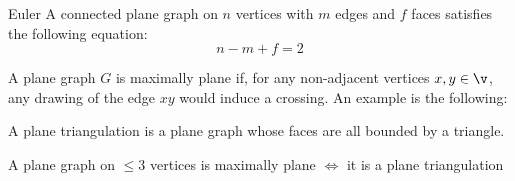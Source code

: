 \begin{customtheorem}{Euler}
\label{theorem:euler}
    A connected plane graph on $n$ vertices with $m$ edges and $f$ faces satisfies the following equation:
    \begin{equation*}
        n  - m + f = 2
    \end{equation*}
\end{customtheorem}
A plane graph $G$ is maximally plane if, for any non-adjacent vertices $x, y \in \v$, any drawing of the edge $xy$ would induce a crossing. An example is the following:
\begin{definition}
    A plane triangulation is a plane graph whose faces are all bounded by a triangle.
\end{definition}
\begin{customlemma}{4.8}
\label{lemma:4.8}
    A plane graph on $\leq 3$ vertices is maximally plane $\iff$ it is a plane triangulation
\end{customlemma}
